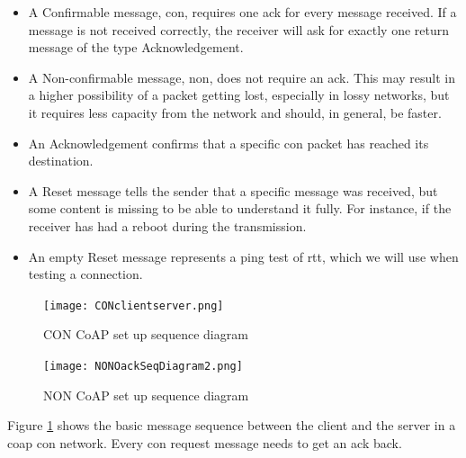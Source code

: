 
\begin{itemize}
	\item A Confirmable message, \gls{con}, requires one \gls{ack} for every message received. If a message is not received correctly, the receiver will ask for exactly one return message of the type Acknowledgement. 
	\item A Non-confirmable message, \gls{non}, does not require an \gls{ack}. This may result in a higher possibility of a packet getting lost, especially in lossy networks, but it requires less capacity from the network and should, in general, be faster. 
	\item An Acknowledgement confirms that a specific \gls{con} packet has reached its destination. 
	\item A Reset message tells the sender that a specific message was received, but some content is missing to be able to understand it fully. For instance, if the receiver has had a reboot during the transmission. 
	\item An empty Reset message represents a ping test of \gls{rtt}, which we will use when testing a connection. 
\end{itemize}
       


\begin{figure}[ht]
    \centering
    \texttt{[image: CONclientserver.png]}    
    \caption{CON CoAP set up sequence diagram \cite{shelby2014constrained}}
    \label{fig:CONOackSeqDiagram}
\end{figure}

 

\begin{figure}[ht]
    \centering
    \texttt{[image: NONOackSeqDiagram2.png]}    
    \caption{NON CoAP set up sequence diagram \cite{shelby2014constrained}}
    \label{fig:NONOackSeqDiagram}
\end{figure}

\noindent Figure \ref{fig:CONOackSeqDiagram} shows the basic message sequence between the client and the server in a \gls{coap} \gls{con} network. Every \gls{con} request message needs to get an \gls{ack} back.

